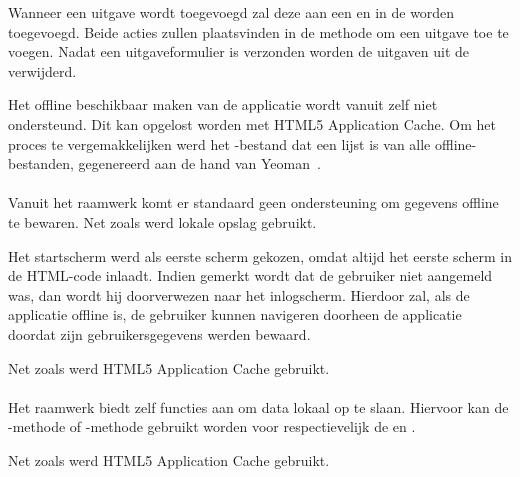 Wanneer een uitgave wordt toegevoegd zal deze aan een  en in de  worden toegevoegd.
Beide acties zullen plaatsvinden in de methode om een uitgave toe te voegen.
Nadat een uitgaveformulier is verzonden worden de uitgaven uit de  verwijderd.


Het offline beschikbaar maken van de applicatie wordt vanuit \kendo{} zelf niet ondersteund.
Dit kan opgelost worden met HTML5 Application Cache.
Om het proces te vergemakkelijken werd het -bestand dat een lijst is van alle offline-bestanden, gegenereerd aan de hand van Yeoman~\cite{Yeoman2013}.

\paragraph{\jqm}
Vanuit het raamwerk komt er standaard geen ondersteuning om gegevens offline te bewaren.
Net zoals \kendo{} werd lokale opslag gebruikt.

Het startscherm werd als eerste scherm gekozen, omdat \jqm{} altijd het eerste scherm in de HTML-code inlaadt.
Indien gemerkt wordt dat de gebruiker niet aangemeld was, dan wordt hij doorverwezen naar het inlogscherm.
Hierdoor zal, als de applicatie offline is, de gebruiker kunnen navigeren doorheen de applicatie doordat zijn gebruikersgegevens werden bewaard.

Net zoals \kendo{} werd HTML5 Application Cache gebruikt.

\paragraph{\lungo}
Het raamwerk biedt zelf functies aan om data lokaal op te slaan.
Hiervoor kan de -methode of -methode gebruikt worden voor respectievelijk de  en .

Net zoals \kendo{} werd HTML5 Application Cache gebruikt.